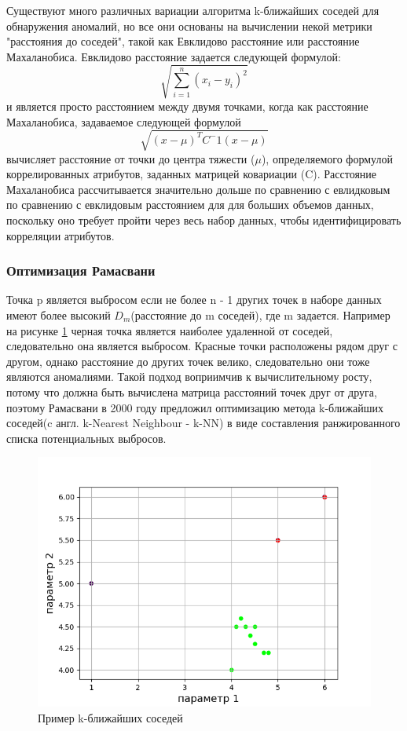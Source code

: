 Существуют много  различных вариации алгоритма k-ближайших соседей для обнаружения аномалий, но все они основаны на вычислении некой метрики "расстояния до соседей", такой как Евклидово расстояние или  расстояние Махаланобиса. Евклидово расстояние задается следующей формулой:
 	\begin{equation}
 	\sqrt{\sum_{i=1}^n(x_i-y_i)^2}
 		\end{equation}
 и является просто расстоянием между двумя точками, когда как  расстояние Махаланобиса, задаваемое следующей формулой
 	\begin{equation}
 	\sqrt{(x-\mu)^T C^-1 (x-\mu)}
 	\end{equation}
 	вычисляет расстояние от точки до центра тяжести ($\mu$), определяемого формулой коррелированных атрибутов, заданных матрицей ковариации (C). Расстояние  Махаланобиса
 	рассчитывается значительно дольше по сравнению с евлидковым
 	 по сравнению с евклидовым расстоянием для для больших объемов данных, поскольку оно требует
 	пройти через весь набор данных, чтобы идентифицировать корреляции атрибутов.

 \subsubsection{Оптимизация Рамасвани} 	
 Точка p является выбросом
если не более n - 1 других точек в наборе данных имеют более высокий $D_m$(расстояние до m соседей), где m задается. Например на рисунке \ref{fig02} черная точка является наиболее удаленной от соседей, следовательно она является выбросом. Красные точки расположены рядом друг с другом, однако расстояние до других точек велико, следовательно они тоже являются аномалиями. Такой подход воприимчив к вычислительному росту, потому что должна быть вычислена матрица расстояний точек друг от друга, поэтому Рамасвани в 2000 году предложил оптимизацию метода k-ближайших соседей(c англ. k-Nearest Neighbour - k-NN)  в виде составления ранжированного списка потенциальных выбросов.
\begin{figure}
	\centering
	\includegraphics[width=.5\textwidth]{img/2.png}
	\caption{Пример k-ближайших соседей}
	\label{fig02}
\end{figure}

